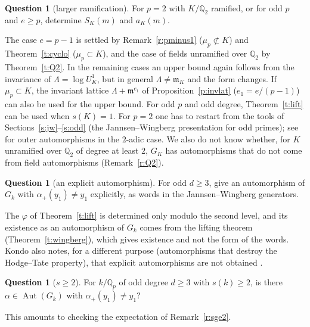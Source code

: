 \documentclass[11pt,a4paper]{article}
\newcommand{\Qp}{\mathbb{Q}_p}
\newcommand{\fm}{\mathfrak{m}}
\newcommand{\Aut}{\operatorname{Aut}}
\theoremstyle{plain}
\theoremstyle{definition}
\newtheorem{question}[theorem]{Question}
\theoremstyle{remark}
\begin{document}
\begin{question}[larger ramification]\label{q:ram}
For $p=2$ with $K/\mathbb Q_2$ ramified, or for odd $p$ and $e\ge p$, determine $S_K(m)$ and $a_K(m)$.
\end{question}
The case $e=p-1$ is settled by Remark~\ref{r:pminus1} ($\mu_p\not\subset K$) and Theorem~\ref{t:cyclo}
($\mu_p\subset K$), and the case of fields unramified over $\mathbb Q_2$ by Theorem~\ref{t:Q2}. In the remaining cases
an upper bound again follows from the invariance of $\Lambda=\log U^1_K$, but in general $\Lambda\ne\fm_K$ and the form
changes. If $\mu_p\subset K$, the invariant lattice $\Lambda+\fm^{e_1}$ of Proposition~\ref{p:invlat}
($e_1=e/(p-1)$) can also be used for the upper bound. For odd $p$ and odd degree, Theorem~\ref{t:lift} can be used
when $s(K)=1$. For $p=2$ one has to restart from the tools of Sections~\ref{s:jw}--\ref{s:odd} (the Jannsen--Wingberg
presentation for odd primes); see \cite{Nishio25} for outer automorphisms in the $2$-adic case. We also do not know
whether, for $K$ unramified over $\mathbb Q_2$ of degree at least $2$, $G_K$ has automorphisms that do not come from
field automorphisms (Remark~\ref{r:Q2}).

\begin{question}[an explicit automorphism]\label{q:explicit}
For odd $d\ge3$, give an automorphism of $G_k$ with $\alpha_+(y_1)\ne y_1$ explicitly, as words in the
Jannsen--Wingberg generators.
\end{question}
The $\varphi$ of Theorem~\ref{t:lift} is determined only modulo the second level, and its existence as an automorphism
of $G_k$ comes from the lifting theorem (Theorem~\ref{t:wingberg}), which gives existence and not the form of the
words. Kondo also notes, for a different purpose (automorphisms that destroy the Hodge--Tate property), that explicit
automorphisms are not obtained \cite[Rem.~3.7]{Kondo26}.

\begin{question}[$s\ge2$]\label{q:sge2}
For $k/\Qp$ of odd degree $d\ge3$ with $s(k)\ge2$, is there $\alpha\in\Aut(G_k)$ with $\alpha_+(y_1)\ne y_1$?
\end{question}
This amounts to checking the expectation of Remark~\ref{r:sge2}.
\end{document}
